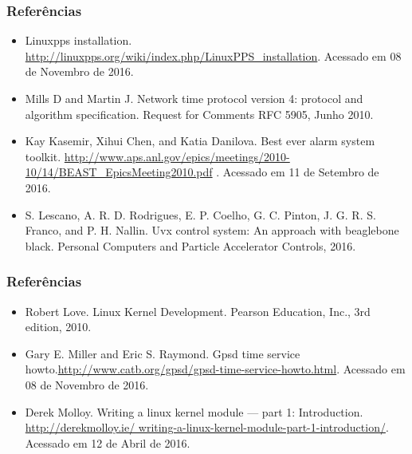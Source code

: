 \begin{frame}
\frametitle{Referências}

{\small
\begin{itemize}
  \item Linuxpps installation. 
  \url{http://linuxpps.org/wiki/index.php/LinuxPPS_installation}. Acessado em 08 de Novembro de 2016.
  \item Mills D and Martin J. Network time protocol version 4: protocol and
  algorithm specification. Request for Comments RFC 5905, Junho 2010.
\item  Kay Kasemir, Xihui Chen, and Katia Danilova. Best ever alarm system
toolkit. \url{http://www.aps.anl.gov/epics/meetings/2010-10/14/BEAST_EpicsMeeting2010.pdf} . Acessado em 11 de Setembro de 2016.
\item S. Lescano, A. R. D. Rodrigues, E. P. Coelho, G. C. Pinton, J. G. R. S.
 Franco, and P. H. Nallin. Uvx control system: An approach with beaglebone
 black. Personal Computers and Particle Accelerator Controls, 2016.
\end{itemize}
}
\end{frame}

\begin{frame}
\frametitle{Referências}
{\small
\begin{itemize}
\item Robert Love. Linux Kernel Development. Pearson Education, Inc., 3rd
edition, 2010.
\item Gary E. Miller and Eric S. Raymond.
Gpsd time service
howto.\url{http://www.catb.org/gpsd/gpsd-time-service-howto.html}. Acessado em 08 de Novembro de 2016.
\item Derek Molloy. Writing a linux kernel module — part 1: Introduction.
\url{http://derekmolloy.ie/ writing-a-linux-kernel-module-part-1-introduction/}. 
Acessado em 12 de Abril de 2016.
\end{itemize}
}

\end{frame}